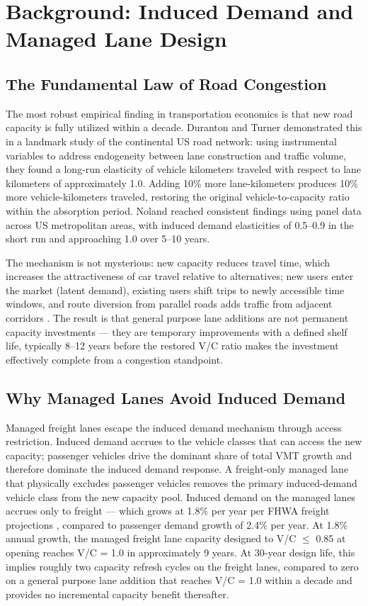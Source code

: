 \section{Background: Induced Demand and Managed Lane Design}
\label{sec:literature}

\subsection{The Fundamental Law of Road Congestion}

The most robust empirical finding in transportation economics is that new road capacity is fully utilized within a decade. Duranton and Turner \citep{Duranton2011} demonstrated this in a landmark study of the continental US road network: using instrumental variables to address endogeneity between lane construction and traffic volume, they found a long-run elasticity of vehicle kilometers traveled with respect to lane kilometers of approximately 1.0. Adding 10\% more lane-kilometers produces 10\% more vehicle-kilometers traveled, restoring the original vehicle-to-capacity ratio within the absorption period. Noland \citep{Noland2001} reached consistent findings using panel data across US metropolitan areas, with induced demand elasticities of 0.5--0.9 in the short run and approaching 1.0 over 5--10 years.

The mechanism is not mysterious: new capacity reduces travel time, which increases the attractiveness of car travel relative to alternatives; new users enter the market (latent demand), existing users shift trips to newly accessible time windows, and route diversion from parallel roads adds traffic from adjacent corridors \citep{Duranton2011}. The result is that general purpose lane additions are not permanent capacity investments --- they are temporary improvements with a defined shelf life, typically 8--12 years before the restored V/C ratio makes the investment effectively complete from a congestion standpoint.

\subsection{Why Managed Lanes Avoid Induced Demand}

Managed freight lanes escape the induced demand mechanism through access restriction. Induced demand accrues to the vehicle classes that can access the new capacity; passenger vehicles drive the dominant share of total VMT growth and therefore dominate the induced demand response. A freight-only managed lane that physically excludes passenger vehicles removes the primary induced-demand vehicle class from the new capacity pool. Induced demand on the managed lanes accrues only to freight --- which grows at 1.8\% per year per FHWA freight projections \citep{FHWA_freight2023}, compared to passenger demand growth of 2.4\% per year. At 1.8\% annual growth, the managed freight lane capacity designed to V/C $\leq$ 0.85 at opening reaches V/C = 1.0 in approximately 9 years. At 30-year design life, this implies roughly two capacity refresh cycles on the freight lanes, compared to zero on a general purpose lane addition that reaches V/C = 1.0 within a decade and provides no incremental capacity benefit thereafter.

